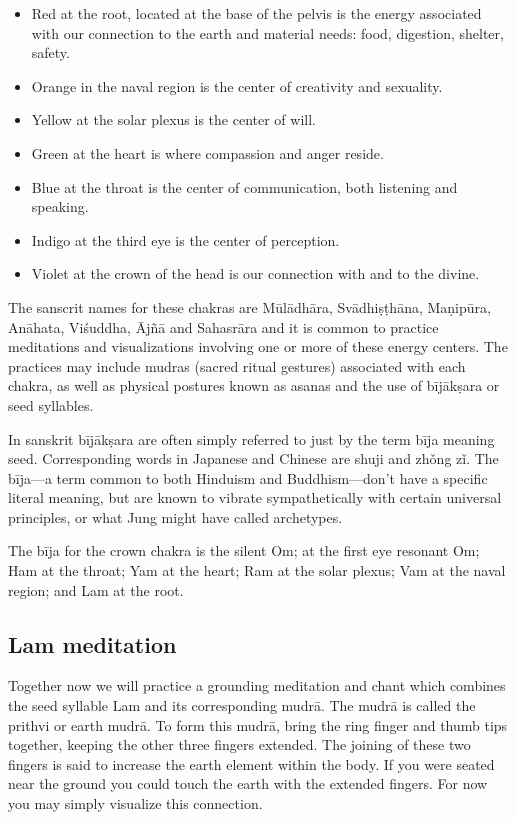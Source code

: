 \documentclass[12pt]{article}
\begin{document}
\begin{itemize}
  \item Red at the root, located at the base of the pelvis is the energy associated with our connection to the earth and material needs: food, digestion, shelter, safety.
  \item Orange in the naval region is the center of creativity and sexuality.
  \item Yellow at the solar plexus is the center of will.
  \item Green at the heart is where compassion and anger reside.
  \item Blue at the throat is the center of communication, both listening and speaking.
  \item Indigo at the third eye is the center of perception.
  \item Violet at the crown of the head is our connection with and to the divine.
\end{itemize}

The sanscrit names for these chakras are Mūlādhāra, Svādhiṣṭhāna, Maṇipūra, Anāhata, Viśuddha, Ājñā and Sahasrāra and it is common to practice meditations and visualizations involving one or more of these energy centers. The practices may include mudras (sacred ritual gestures) associated with each chakra, as well as physical postures known as asanas and the use of bījākṣara or seed syllables.

In sanskrit bījākṣara are often simply referred to just by the term bīja meaning seed. Corresponding words in Japanese and Chinese are shuji and zhǒng zǐ. The bīja—a term common to both Hinduism and Buddhism—don't have a specific literal meaning, but are known to vibrate sympathetically with certain universal principles, or what Jung might have called archetypes.

The bīja for the crown chakra is the silent Om; at the first eye resonant Om; Ham at the throat; Yam at the heart; Ram at the solar plexus; Vam at the naval region; and Lam at the root.

\subsection*{Lam meditation}

Together now we will practice a grounding meditation and chant which combines the seed syllable Lam and its corresponding mudrā. The mudrā is called the prithvi or earth mudrā. To form this mudrā, bring the ring finger and thumb tips together, keeping the other three fingers extended. The joining of these two fingers is said to increase the earth element within the body. If you were seated near the ground you could touch the earth with the extended fingers. For now you may simply visualize this connection.
\end{document}
